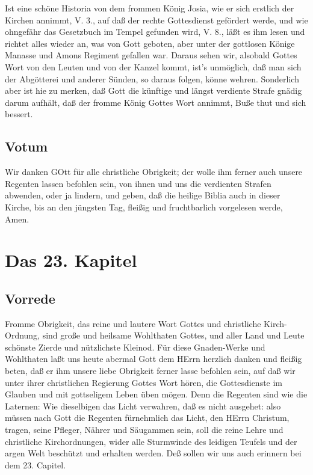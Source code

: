 Ist eine schöne Historia von dem frommen König Josia, wie er sich erstlich der Kirchen annimmt, V. 3., auf daß der rechte Gottesdienst gefördert werde, und wie ohngefähr das Gesetzbuch im Tempel gefunden wird, V. 8., läßt es ihm lesen und richtet alles wieder an, was von Gott geboten, aber unter der gottlosen Könige Manasse und Amons Regiment gefallen war. Daraus sehen wir, alsobald Gottes Wort von den Leuten und von der Kanzel kommt, ist’s unmöglich, daß man sich der Abgötterei und anderer Sünden, so daraus folgen, könne wehren. Sonderlich aber ist hie zu merken, daß Gott die künftige und längst verdiente Strafe gnädig darum aufhält, daß der fromme König Gottes Wort annimmt, Buße thut und sich bessert.

\section{Votum}

Wir danken GOtt für alle christliche Obrigkeit; der wolle ihm ferner auch unsere Regenten lassen befohlen sein, von ihnen und uns die verdienten Strafen abwenden, oder ja lindern, und geben, daß die heilige Biblia auch in dieser Kirche, bis an den jüngsten Tag, fleißig und fruchtbarlich vorgelesen werde, Amen.

\chapter{Das 23. Kapitel}

\section{Vorrede}

Fromme Obrigkeit, das reine und lautere Wort Gottes und christliche Kirch-Ordnung, sind große und heilsame Wohlthaten Gottes, und aller Land und Leute schönste Zierde und nützlichste Kleinod. Für diese Gnaden-Werke und Wohlthaten laßt uns heute abermal Gott dem HErrn herzlich danken und fleißig beten, daß er ihm unsere liebe Obrigkeit ferner lasse befohlen sein, auf daß wir unter ihrer christlichen Regierung Gottes Wort hören, die Gottesdienste im Glauben und mit gottseligem Leben üben mögen. Denn die Regenten sind wie die Laternen: Wie dieselbigen das Licht verwahren, daß es nicht ausgehet: also müssen nach Gott die Regenten fürnehmlich das Licht, den HErrn Christum, tragen, seine Pfleger, Nährer und Säugammen sein, soll die reine Lehre und christliche Kirchordnungen, wider alle Sturmwinde des leidigen Teufels und der argen Welt beschützt und erhalten werden. Deß sollen wir uns auch erinnern bei dem 23. Capitel.

